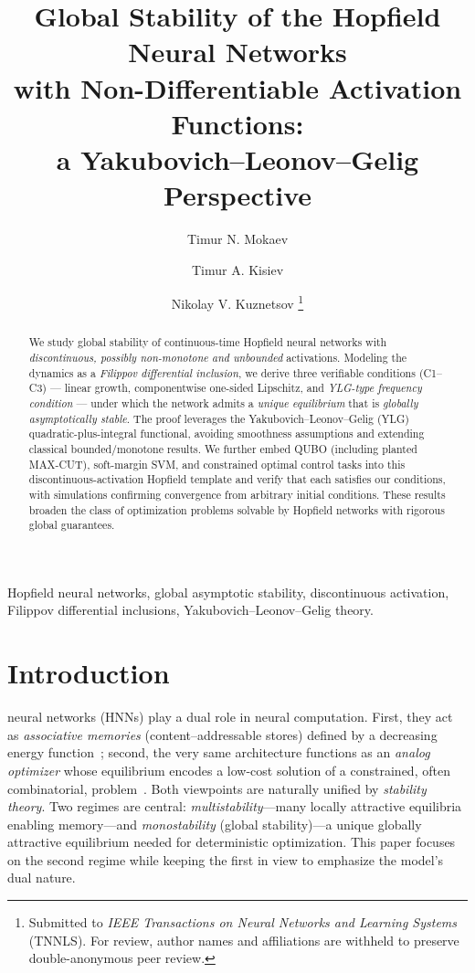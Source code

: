 \documentclass[journal]{IEEEtran}
\title{Global Stability of the Hopfield Neural Networks\\ with Non-Differentiable Activation Functions:\\
            a Yakubovich--Leonov--Gelig Perspective}
\author{Timur N. Mokaev \and Timur A. Kisiev \and Nikolay V. Kuznetsov
      \thanks{Submitted to \emph{IEEE Transactions on Neural Networks and Learning Systems} (TNNLS). 
            For review, author names and affiliations are withheld to preserve double-anonymous peer review.}
}
\begin{document}
\maketitle

\begin{abstract}
We study global stability of continuous-time Hopfield neural networks with 
\emph{discontinuous, possibly non-monotone and unbounded} activations. 
Modeling the dynamics as a \emph{Filippov differential inclusion}, 
we derive three verifiable conditions (C1--C3) --- linear growth, componentwise one-sided Lipschitz, 
and \emph{YLG-type frequency condition} --- under which the network admits a \emph{unique equilibrium} 
that is \emph{globally asymptotically stable}. 
The proof leverages the Yakubovich--Leonov--Gelig (YLG) quadratic-plus-integral functional, 
avoiding smoothness assumptions and extending classical bounded/monotone results. 
We further embed QUBO (including planted MAX-CUT), soft-margin SVM, and constrained optimal control tasks 
into this discontinuous-activation Hopfield template and verify that each satisfies our conditions, with simulations confirming convergence from arbitrary initial conditions. 
These results broaden the class of optimization problems solvable by Hopfield networks with rigorous global guarantees.
\end{abstract}

\begin{IEEEkeywords}
Hopfield neural networks, 
global asymptotic stability, 
discontinuous activation, 
Filippov differential inclusions, 
Yakubovich--Leonov--Gelig theory.
\end{IEEEkeywords}


\section{Introduction}\label{sec:intro}
 neural networks (HNNs) play a dual role in neural computation.
First, they act as \emph{associative memories} (content--addressable stores) defined by a
decreasing energy function~\cite{hopfield1982}; second, the very same architecture functions as an
\emph{analog optimizer} whose equilibrium encodes a low-cost solution of a constrained,
often combinatorial, problem~\cite{hopfieldTank1985}.
Both viewpoints are naturally unified by \emph{stability theory}.
Two regimes are central: \emph{multistability}---many locally attractive equilibria enabling memory---and
\emph{monostability} (global stability)---a unique globally attractive equilibrium needed for deterministic optimization.
This paper focuses on the second regime while keeping the first in view to emphasize the model's dual nature.
\end{document}
